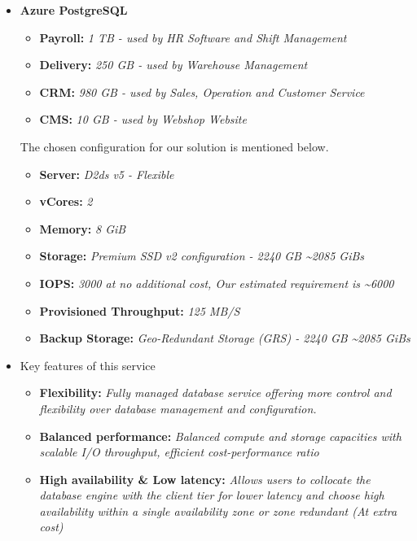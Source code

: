 \documentclass{llncs}
\begin{document}
\begin{itemize}
    \item \textbf{Azure PostgreSQL}
          \begin{itemize}
              \item \textbf{Payroll:} \textit{1 TB - used by HR Software and Shift Management}
              \item  \textbf{Delivery:} \textit{250 GB - used by Warehouse Management}
              \item  \textbf{CRM:} \textit{980 GB - used by Sales, Operation and Customer Service}
              \item  \textbf{CMS:} \textit{10 GB - used by Webshop Website}
          \end{itemize} \leavevmode\newline
 The chosen configuration for our solution is mentioned below.
          \begin{itemize}
              \item \textbf{Server:} \textit{D2ds v5 - Flexible}
              \item  \textbf{vCores:} \textit{2}
              \item  \textbf{Memory:} \textit{8 GiB}
              \item  \textbf{Storage:} \textit{Premium SSD v2 configuration - 2240 GB \textasciitilde 2085 GiBs}
              \item  \textbf{IOPS:} \textit{3000 at no additional cost, Our estimated requirement is \textasciitilde 6000}
              \item  \textbf{Provisioned Throughput:} \textit{125 MB/S}
              \item  \textbf{Backup Storage:} \textit{Geo-Redundant Storage (GRS) - 2240 GB \textasciitilde 2085 GiBs}
          \end{itemize}
    \item Key features of this service
          \begin{itemize}
              \item  \textbf{Flexibility:} \textit{Fully managed database service offering more control and flexibility over database management and configuration.}
              \item  \textbf{Balanced performance:} \textit{Balanced compute and storage capacities with scalable I/O throughput, efficient cost-performance ratio}
              \item  \textbf{High availability \& Low latency:} \textit{Allows users to collocate the database engine with the client tier for lower latency and choose high availability within a single availability zone or zone redundant (At extra cost)}

\end{itemize}
\end{itemize}
\end{document}
